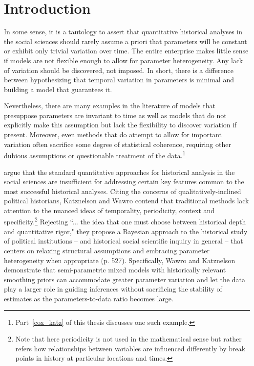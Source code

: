 \chapter{Introduction}
\label{introduction}

In some sense, it is a tautology to assert that quantitative historical analyses in the social sciences should rarely assume a priori that parameters will be constant or exhibit only trivial variation over time. The entire enterprise makes little sense if models are not flexible enough to allow for parameter heterogeneity. Any lack of variation should be discovered, not imposed. In short, there is a difference between hypothesizing that temporal variation in parameters is minimal and building a model that guarantees it. 

Nevertheless, there are many examples in the literature of models that presuppose parameters are invariant to time as well as models that do not explicitly make this assumption but lack the flexibility to discover variation if present.  Moreover, even methods that do attempt to allow for important variation often sacrifice some degree of statistical coherence, requiring other dubious assumptions or questionable treatment of the data.\footnote{Part~\ref{cox_katz} of this thesis discusses one such example.}

 argue that the standard quantitative approaches for historical analysis in the social sciences are insufficient for addressing certain key features common to the most successful historical analyses. Citing the concerns of qualitatively-inclined political historians, Katznelson and Wawro contend that traditional methods lack attention to the nuanced ideas of temporality, periodicity, context and specificity.\footnote{Note that here periodicity is not used in the mathematical sense but rather refers how relationships between variables are influenced differently by break points in history at particular locations and times.}  Rejecting ``... the idea that one must choose between historical depth and quantitative rigor," they propose a Bayesian approach to the historical study of political institutions -- and historical social scientific inquiry in general --  that centers on relaxing structural assumptions and embracing  parameter heterogeneity when appropriate (p. 527). Specifically, Wawro and Katznelson demonstrate that semi-parametric mixed models with historically relevant smoothing priors can accommodate greater parameter variation and let the data play a larger role in guiding inferences without sacrificing the stability of estimates as the parameters-to-data ratio becomes large.  

